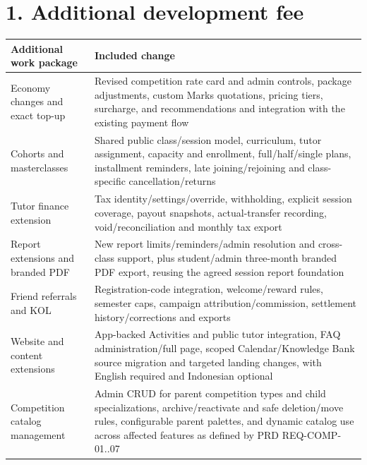\documentclass[11pt,a4paper]{article}
\newcounter{none}
\begin{document}
\section{1. Additional development fee}\label{additional-development-fee}

{\def\LTcaptype{none} %
\begin{longtable}[]{@{}
  >{\raggedright\arraybackslash}p{}
  >{\raggedright\arraybackslash}p{}@{}}
\toprule\noalign{}
\begin{minipage}[b]{\linewidth}\raggedright
Additional work package
\end{minipage} & \begin{minipage}[b]{\linewidth}\raggedright
Included change
\end{minipage} \\
\midrule\noalign{}
\endhead
\bottomrule\noalign{}
\endlastfoot
Economy changes and exact top-up & Revised competition rate card and admin controls, package adjustments, custom Marks quotations, pricing tiers, surcharge, and recommendations and integration with the existing payment flow \\
Cohorts and masterclasses & Shared public class/session model, curriculum, tutor assignment, capacity and enrollment, full/half/single plans, installment reminders, late joining/rejoining and class-specific cancellation/returns \\
Tutor finance extension & Tax identity/settings/override, withholding, explicit session coverage, payout snapshots, actual-transfer recording, void/reconciliation and monthly tax export \\
Report extensions and branded PDF & New report limits/reminders/admin resolution and cross-class support, plus student/admin three-month branded PDF export, reusing the agreed session report foundation \\
Friend referrals and KOL & Registration-code integration, welcome/reward rules, semester caps, campaign attribution/commission, settlement history/corrections and exports \\
Website and content extensions & App-backed Activities and public tutor integration, FAQ administration/full page, scoped Calendar/Knowledge Bank source migration and targeted landing changes, with English required and Indonesian optional \\
Competition catalog management & Admin CRUD for parent competition types and child specializations, archive/reactivate and safe deletion/move rules, configurable parent palettes, and dynamic catalog use across affected features as defined by PRD REQ-COMP-01..07 \\
\end{longtable}
}
\end{document}
